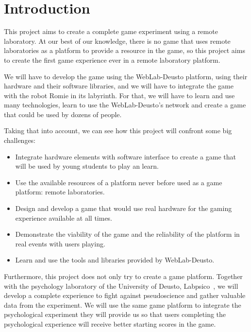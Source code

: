 \chapter{Introduction}

This project aims to create a complete game experiment using a remote laboratory. At our best of our
knowledge, there is no game that uses remote laboratories as a platform to provide a resource in the
game, so this project aims to create the first game experience ever in a remote laboratory platform.

We will have to develop the game using the WebLab-Deusto platform, using their hardware and their
software libraries, and we will have to integrate the game with the robot Romie in its labyrinth.
For that, we will have to learn and use many technologies, learn to use the WebLab-Deusto's network
and create a game that could be used by dozens of people.

Taking that into account, we can see how this project will confront some big challenges:

\begin{itemize}

\item Integrate hardware elements with software interface to create a game that will be used by
young students to play an learn.

\item Use the available resources of a platform never before used as a game platform: remote
laboratories.

\item Design and develop a game that would use real hardware for the gaming experience available
at all times.

\item Demonstrate the viability of the game and the reliability of the platform in real events with
users playing.

\item Learn and use the tools and libraries provided by WebLab-Deusto.

\end{itemize}

Furthermore, this project does not only try to create a game platform. Together with the psychology
laboratory of the University of Deusto, Labpsico~\cite{labpsico_web}, we will develop a complete
experience to fight against pseudoscience and gather valuable data from the experiment. We will use
the same game platform to integrate the psychological experiment they will provide us so that users
completing the psychological experience will receive better starting scores in the game.

